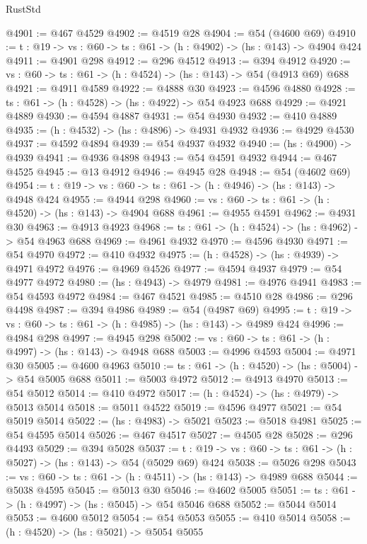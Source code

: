 \begin{lexlean}{RustStd}
\begin{coremodule}
{\begin{coremodule}
{{{{{{{{@4901 := @467 @4529
@4902 := @4519 @28
@4904 := @54 (@4600 @69)
@4910 := {t : @19} -> {vs : @60} -> {ts : @61} -> (h : @4902) -> (hs : @143) -> @4904 @424
@4911 := @4901 @298
@4912 := @296 @4512
@4913 := @394 @4912
@4920 := {vs : @60} -> {ts : @61} -> (h : @4524) -> (hs : @143) -> @54 (@4913 @69) @688
@4921 := @4911 @4589
@4922 := @4888 @30
@4923 := @4596 @4880
@4928 := {ts : @61} -> (h : @4528) -> (hs : @4922) -> @54 @4923 @688
@4929 := @4921 @4889
@4930 := @4594 @4887
@4931 := @54 @4930
@4932 := @410 @4889
@4935 := (h : @4532) -> (hs : @4896) -> @4931 @4932
@4936 := @4929 @4530
@4937 := @4592 @4894
@4939 := @54 @4937 @4932
@4940 := (hs : @4900) -> @4939
@4941 := @4936 @4898
@4943 := @54 @4591 @4932
@4944 := @467 @4525
@4945 := @13 @4912
@4946 := @4945 @28
@4948 := @54 (@4602 @69)
@4954 := {t : @19} -> {vs : @60} -> {ts : @61} -> (h : @4946) -> (hs : @143) -> @4948 @424
@4955 := @4944 @298
@4960 := {vs : @60} -> {ts : @61} -> (h : @4520) -> (hs : @143) -> @4904 @688
@4961 := @4955 @4591
@4962 := @4931 @30
@4963 := @4913 @4923
@4968 := {ts : @61} -> (h : @4524) -> (hs : @4962) -> @54 @4963 @688
@4969 := @4961 @4932
@4970 := @4596 @4930
@4971 := @54 @4970
@4972 := @410 @4932
@4975 := (h : @4528) -> (hs : @4939) -> @4971 @4972
@4976 := @4969 @4526
@4977 := @4594 @4937
@4979 := @54 @4977 @4972
@4980 := (hs : @4943) -> @4979
@4981 := @4976 @4941
@4983 := @54 @4593 @4972
@4984 := @467 @4521
@4985 := @4510 @28
@4986 := @296 @4498
@4987 := @394 @4986
@4989 := @54 (@4987 @69)
@4995 := {t : @19} -> {vs : @60} -> {ts : @61} -> (h : @4985) -> (hs : @143) -> @4989 @424
@4996 := @4984 @298
@4997 := @4945 @298
@5002 := {vs : @60} -> {ts : @61} -> (h : @4997) -> (hs : @143) -> @4948 @688
@5003 := @4996 @4593
@5004 := @4971 @30
@5005 := @4600 @4963
@5010 := {ts : @61} -> (h : @4520) -> (hs : @5004) -> @54 @5005 @688
@5011 := @5003 @4972
@5012 := @4913 @4970
@5013 := @54 @5012
@5014 := @410 @4972
@5017 := (h : @4524) -> (hs : @4979) -> @5013 @5014
@5018 := @5011 @4522
@5019 := @4596 @4977
@5021 := @54 @5019 @5014
@5022 := (hs : @4983) -> @5021
@5023 := @5018 @4981
@5025 := @54 @4595 @5014
@5026 := @467 @4517
@5027 := @4505 @28
@5028 := @296 @4493
@5029 := @394 @5028
@5037 := {t : @19} -> {vs : @60} -> {ts : @61} -> (h : @5027) -> (hs : @143) -> @54 (@5029 @69) @424
@5038 := @5026 @298
@5043 := {vs : @60} -> {ts : @61} -> (h : @4511) -> (hs : @143) -> @4989 @688
@5044 := @5038 @4595
@5045 := @5013 @30
@5046 := @4602 @5005
@5051 := {ts : @61} -> (h : @4997) -> (hs : @5045) -> @54 @5046 @688
@5052 := @5044 @5014
@5053 := @4600 @5012
@5054 := @54 @5053
@5055 := @410 @5014
@5058 := (h : @4520) -> (hs : @5021) -> @5054 @5055
}}}}}}}}
\end{coremodule}}
\end{coremodule}
\end{lexlean}
